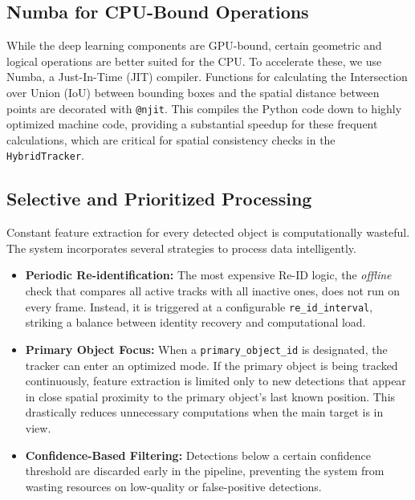 \documentclass[conference]{IEEEtran}
\begin{document}
\subsection{Numba for CPU-Bound Operations}
While the deep learning components are GPU-bound, certain geometric and logical operations are better suited for the CPU. To accelerate these, we use Numba, a Just-In-Time (JIT) compiler. Functions for calculating the Intersection over Union (IoU) between bounding boxes and the spatial distance between points are decorated with \texttt{@njit}. This compiles the Python code down to highly optimized machine code, providing a substantial speedup for these frequent calculations, which are critical for spatial consistency checks in the \texttt{HybridTracker}.

\subsection{Selective and Prioritized Processing}
Constant feature extraction for every detected object is computationally wasteful. The system incorporates several strategies to process data intelligently.
\begin{itemize}
    \item \textbf{Periodic Re-identification:} The most expensive Re-ID logic, the \textit{offline} check that compares all active tracks with all inactive ones, does not run on every frame. Instead, it is triggered at a configurable \texttt{re\_id\_interval}, striking a balance between identity recovery and computational load.
    \item \textbf{Primary Object Focus:} When a \texttt{primary\_object\_id} is designated, the tracker can enter an optimized mode. If the primary object is being tracked continuously, feature extraction is limited only to new detections that appear in close spatial proximity to the primary object's last known position. This drastically reduces unnecessary computations when the main target is in view.
    \item \textbf{Confidence-Based Filtering:} Detections below a certain confidence threshold are discarded early in the pipeline, preventing the system from wasting resources on low-quality or false-positive detections.
\end{itemize}
\end{document}
